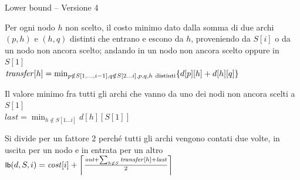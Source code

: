 \begin{frame}{Lower bound -- Versione 4}

\begin{overprint}

\vspace{-9pt}
\begin{myboxtitle}
Per ogni nodo $h$ non scelto, il costo minimo dato dalla somma di due archi $(p, h)$ e $(h, q)$ distinti che entrano e escono da $h$, proveniendo da $S[i]$ o da un nodo non ancora scelto; andando in un nodo non ancora scelto oppure in $S[1]$\\[6pt]
\alert{$
\Transfer[h] = \min_{p \notin S[1, \ldots, i-1], q \notin S[2 \ldots i], p,q,h\ \textrm{distinti}}\{d[p][h] + d[h][q] \}
$}
\end{myboxtitle}

\vspace{-9pt}
\begin{myboxtitle}
Il valore minimo fra tutti gli archi che vanno da uno dei nodi non ancora scelti a $S[1]$\\[6pt]
\alert{$
\mathit{last} = \min_{h \notin S[1 \ldots i]} d[h][S[1]]
$}
\end{myboxtitle}

\vspace{-9pt}
\begin{myboxtitle}
Si divide per un fattore 2 perché tutti gli archi vengono contati due volte, in uscita per un nodo e in entrata per un altro\\[6pt]
\alert{$
\textsf{{\small lb}}(d, S, i) = \mathit{cost}[i] + \left\lceil \frac{\textit{out} + \sum_{h \notin S} \mathit{transfer}[h] + \mathit{last}}{2} \right\rceil$}
\end{myboxtitle}

\end{overprint}


\end{frame}







